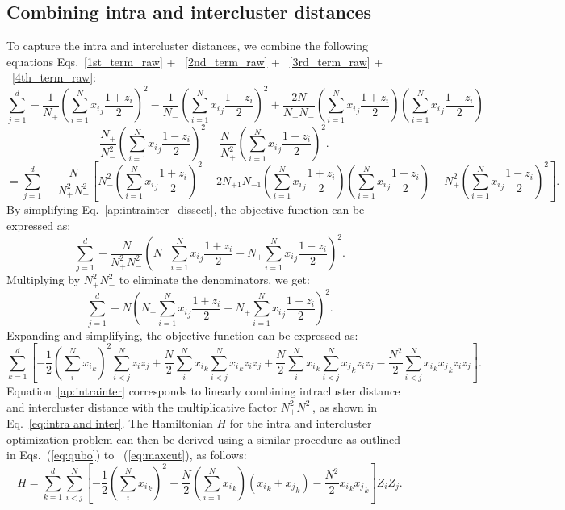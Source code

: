 \documentclass[showpacs,twocolumn,superscriptaddress]{revtex4-2}
\begin{document}
\subsection{Combining intra and intercluster distances}
\label{sec:Appendix_A3}
To capture the intra and intercluster distances, we combine the following equations Eqs.~\eqref{1st_term_raw} + ~\eqref{2nd_term_raw} + ~\eqref{3rd_term_raw} + ~\eqref{4th_term_raw}:
\begin{equation}
    \sum_{j=1}^d -\frac{1}{N_+} \left(\sum_{i=1}^N {x_i}_j \frac{1+z_i}{2}\right)^2 - \frac{1}{N_-} \left(\sum_{i=1}^N {x_i}_j \frac{1-z_i}{2}\right)^2 +\frac{2N}{N_+N_-}\left(\sum_{i=1}^N {x_i}_j \frac{1+z_i}{2}\right)\left(\sum_{i=1}^N {x_i}_j \frac{1-z_i}{2}\right) \nonumber
\end{equation}
\begin{equation}
    - \frac{N_+}{N_{-}^2} \left(\sum_{i=1}^N {x_i}_j \frac{1-z_i}{2}\right)^2 -\frac{N_-}{N_{+}^2}\left(\sum_{i=1}^N {x_i}_j \frac{1+z_i}{2}\right)^2.
\end{equation}
\begin{equation}\label{ap:intrainter_dissect}
    =\sum_{j=1}^d -\frac{N}{N_+^2 N_-^2}\left[N_{-}^2 \left(\sum_{i=1}^N {x_i}_j \frac{1+z_i}{2}\right)^2 - 2N_{+1}N_{-1}\left(\sum_{i=1}^N {x_i}_j \frac{1+z_i}{2}\right)\left(\sum_{i=1}^N {x_i}_j \frac{1-z_i}{2}\right) 
    +N_{+}^2 \left(\sum_{i=1}^N {x_i}_j \frac{1-z_i}{2}\right)^2 \right].
\end{equation}
By simplifying Eq.~\ref{ap:intrainter_dissect}, the objective function can be expressed as:
\begin{equation}
    \sum_{j=1}^d -\frac{N}{N_+^2 N_-^2} \left(N_- \sum_{i=1}^N {x_i}_j \frac{1+z_i}{2} - N_+ \sum_{i=1}^N {x_i}_j \frac{1-z_i}{2}\right)^2.
\end{equation}
Multiplying by $N_+^2 N_-^2$ to eliminate the denominators, we get:
\begin{equation}
    \sum_{j=1}^d -N\left(N_{-}\sum_{i=1}^N{{x_i}_j}\frac{1+z_i}{2}-N_{+}\sum_{i=1}^{N}{{x_i}_j}\frac{1-z_i}{2}\right)^2.
\end{equation}
Expanding and simplifying, the objective function can be expressed as:
\begin{equation}\label{ap:intrainter}
    \sum_{k=1}^d\left[-\frac{1}{2}\left(\sum_i^N{x_i}_k\right)^2\sum_{i<j}^N{z_iz_j}+\frac{N}{2}\sum_i^N{x_i}_k\sum_{i<j}^N{{x_i}_kz_iz_j}+\frac{N}{2}\sum_i^N{x_i}_k\sum_{i<j}^N{{x_j}_kz_iz_j}-\frac{N^2}{2}\sum_{i<j}^N{{x_i}_k{x_j}_kz_iz_j}\right].
\end{equation}
Equation~\eqref{ap:intrainter} corresponds to linearly combining intracluster distance and intercluster distance with the multiplicative factor $N_{+}^2 N_{-}^2$, as shown in Eq.~\eqref{eq:intra and inter}. The Hamiltonian $H$ for the intra and intercluster optimization problem can then be derived using a similar procedure as outlined in Eqs.~(\ref{eq:qubo}) to ~(\ref{eq:maxcut}), as follows:
\begin{equation}
    H = \sum_{k=1}^d \sum_{i<j}^N \left[ -\frac{1}{2}\left(\sum_{i}^N{x_i}_k\right)^2 + \frac{N}{2}\left(\sum_{i=1}^N{x_i}_k\right)({{x_i}_k + {x_j}_k}) - \frac{N^2}{2}{{x_i}_k}{{x_j}_k}\right]Z_iZ_j.
\end{equation}
\end{document}
